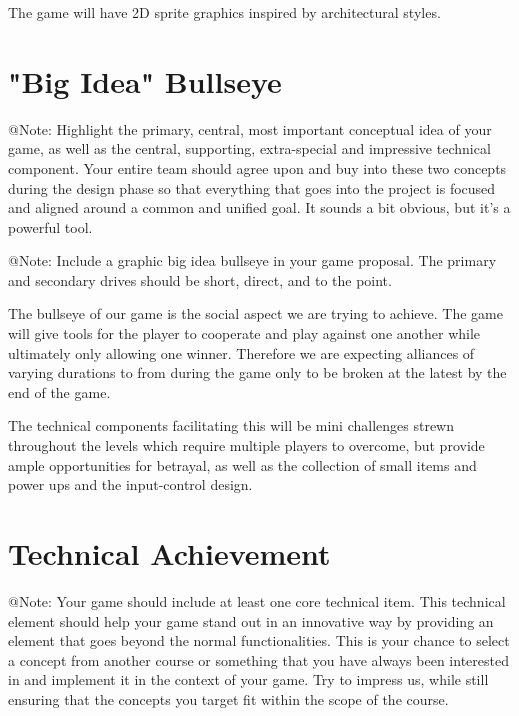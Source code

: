 The game will have 2D sprite graphics inspired by architectural styles.





\section{"Big Idea" Bullseye}

\begin{TempText}
	@Note: Highlight the primary, central, most important conceptual idea of your game, as well as the central, supporting, extra-special and impressive technical component. Your entire team should agree upon and buy into these two concepts during the design phase so that everything that goes into the project is focused and aligned around a common and unified goal. It sounds a bit obvious, but it's a powerful tool.
\end{TempText}

\begin{TempText}
	@Note: Include a graphic big idea bullseye in your game proposal. The primary and secondary drives should be short, direct, and to the point.
\end{TempText}

The bullseye of our game is the social aspect we are trying to achieve. The game will give tools for the player to cooperate and play against one another while ultimately only allowing one winner. Therefore we are expecting alliances of varying durations to from during the game only to be broken at the latest by the end of the game.

The technical components facilitating this will be mini challenges strewn throughout the levels which require multiple players to overcome, but provide ample opportunities for betrayal, as well as the collection of small items and power ups and the input-control design.


\section{Technical Achievement}

\begin{TempText}
	@Note: Your game should include at least one core technical item. This technical element should help your game stand out in an innovative way by providing an element that goes beyond the normal functionalities. This is your chance to select a concept from another course or something that you have always been interested in and implement it in the context of your game. Try to impress us, while still ensuring that the concepts you target fit within the scope of the course.
\end{TempText}

